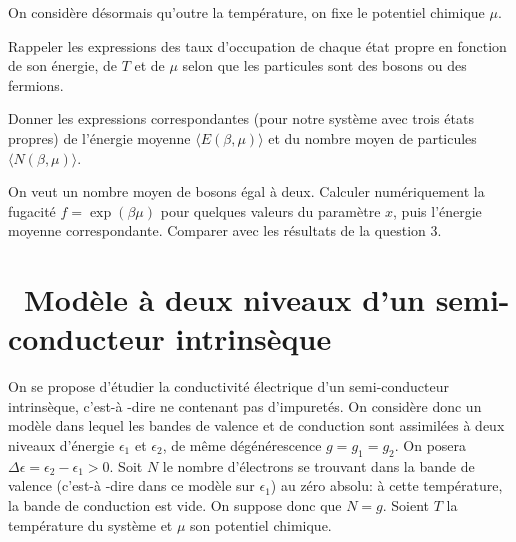 \documentclass[utf8, 11pt]{feuille}
\begin{document}
\medskip

On considère désormais qu'outre la température, on fixe le potentiel chimique $\mu$.

\medskip

\question
Rappeler les expressions des taux d'occupation de chaque état propre en fonction de son énergie, de $T$ et de $\mu$ selon que les particules sont des bosons ou des fermions.

\question
Donner les expressions correspondantes (pour notre système avec trois états propres) de l'énergie moyenne $\langle E (\beta,\mu) \rangle$ et du nombre moyen de particules $\langle N(\beta,\mu) \rangle$.

\question
On veut un nombre moyen de bosons égal à deux. Calculer numériquement la fugacité $f=\exp(\beta \mu)$ pour quelques valeurs du paramètre $x$, puis l'énergie moyenne correspondante. Comparer avec les résultats de la question 3.  



\section{\medium~Modèle à  deux niveaux d'un semi-conducteur intrinsèque}

On se propose d'étudier la conductivité électrique d'un semi-conducteur intrinsèque, c'est-à -dire ne contenant pas d'impuretés. On considère donc un modèle dans lequel les bandes de valence et de conduction sont assimilées à  deux niveaux d'énergie $\epsilon_1$ et $\epsilon_2$, de même dégénérescence $g=g_1=g_2$. On posera $\Delta \epsilon=\epsilon_2-\epsilon_1 > 0$. Soit $N$ le nombre d'électrons se trouvant dans la bande de valence (c'est-à -dire dans ce modèle sur $\epsilon_1$) au zéro absolu:  à  cette température, la bande de conduction est vide. On suppose donc que $N=g$. Soient $T$ la température du système et $\mu$ son potentiel chimique.


\end{document}
